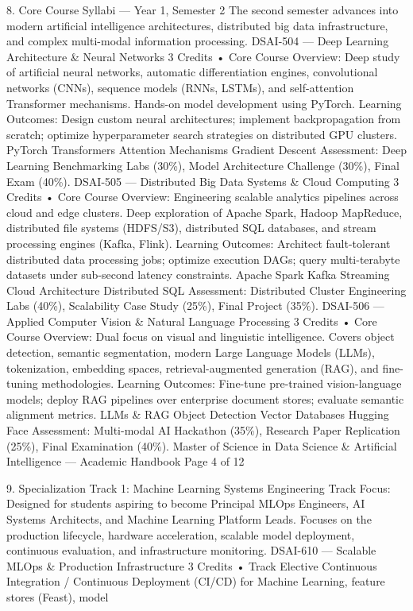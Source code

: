 8. Core Course Syllabi — Year 1, Semester 2
The second semester advances into modern artificial intelligence architectures, distributed big data infrastructure,
and complex multi-modal information processing.
DSAI-504 — Deep Learning Architecture \& Neural Networks
3 Credits • Core
Course Overview: Deep study of artificial neural networks, automatic differentiation engines, convolutional
networks (CNNs), sequence models (RNNs, LSTMs), and self-attention Transformer mechanisms. Hands-on
model development using PyTorch.
Learning Outcomes: Design custom neural architectures; implement backpropagation from scratch; optimize
hyperparameter search strategies on distributed GPU clusters.
PyTorch Transformers Attention Mechanisms Gradient Descent
Assessment: Deep Learning Benchmarking Labs (30\%), Model Architecture Challenge (30\%), Final Exam (40\%).
DSAI-505 — Distributed Big Data Systems \& Cloud Computing
3 Credits • Core
Course Overview: Engineering scalable analytics pipelines across cloud and edge clusters. Deep exploration of
Apache Spark, Hadoop MapReduce, distributed file systems (HDFS/S3), distributed SQL databases, and stream
processing engines (Kafka, Flink).
Learning Outcomes: Architect fault-tolerant distributed data processing jobs; optimize execution DAGs; query
multi-terabyte datasets under sub-second latency constraints.
Apache Spark Kafka Streaming Cloud Architecture Distributed SQL
Assessment: Distributed Cluster Engineering Labs (40\%), Scalability Case Study (25\%), Final Project (35\%).
DSAI-506 — Applied Computer Vision \& Natural Language Processing
3 Credits • Core
Course Overview: Dual focus on visual and linguistic intelligence. Covers object detection, semantic
segmentation, modern Large Language Models (LLMs), tokenization, embedding spaces, retrieval-augmented
generation (RAG), and fine-tuning methodologies.
Learning Outcomes: Fine-tune pre-trained vision-language models; deploy RAG pipelines over enterprise
document stores; evaluate semantic alignment metrics.
LLMs \& RAG Object Detection Vector Databases Hugging Face
Assessment: Multi-modal AI Hackathon (35\%), Research Paper Replication (25\%), Final Examination (40\%).
Master of Science in Data Science \& Artificial Intelligence — Academic Handbook
Page 4 of 12

9. Specialization Track 1: Machine Learning Systems Engineering
Track Focus: Designed for students aspiring to become Principal MLOps Engineers, AI Systems Architects, and
Machine Learning Platform Leads. Focuses on the production lifecycle, hardware acceleration, scalable model
deployment, continuous evaluation, and infrastructure monitoring.
DSAI-610 — Scalable MLOps \& Production Infrastructure
3 Credits • Track Elective
Continuous Integration / Continuous Deployment (CI/CD) for Machine Learning, feature stores (Feast), model

